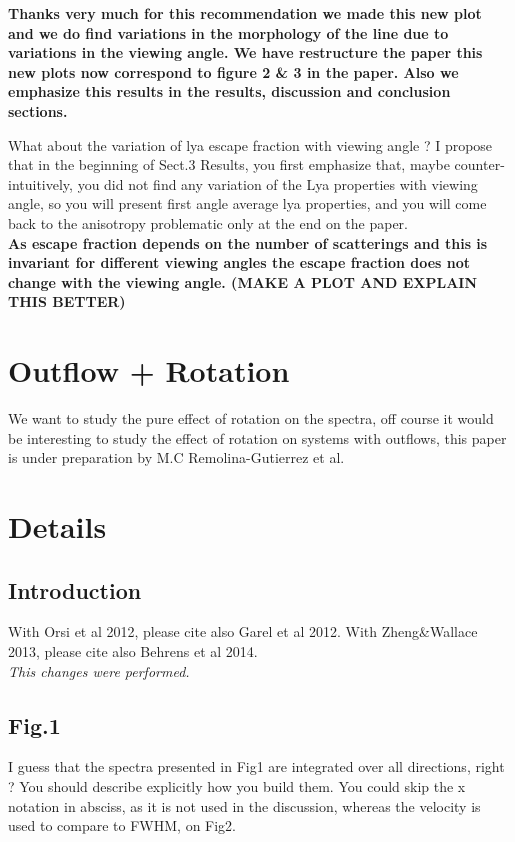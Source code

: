 \documentclass[12pt]{article}
\begin{document}
\textbf{Thanks very much for this recommendation we made this new plot and we do find variations in the morphology of the line due to variations in the viewing angle. We have restructure the paper this new plots now correspond to figure 2 & 3 in the paper.  Also we emphasize this results in the results, discussion and conclusion sections.\\}

What about the variation of lya escape fraction with viewing angle ? I propose that in the beginning of Sect.3 Results, you first emphasize that, maybe counter-intuitively, you did not find any variation of the Lya properties with viewing angle, so you will present first angle average lya properties, and you will come back to the anisotropy problematic only at the end on the paper.\\

\textbf{As escape fraction depends on the number of scatterings and this is invariant for different viewing angles the escape fraction does not change with the viewing angle. (MAKE A PLOT AND EXPLAIN THIS BETTER)
}


\section*{Outflow + Rotation}

We want to study the pure effect of rotation on the spectra, off course it would
be interesting to study the effect of rotation on systems with outflows, this paper
is under preparation by M.C Remolina-Gutierrez et al.  

\section*{Details}

\subsection*{Introduction}

With Orsi et al 2012, please cite also Garel et al 2012. With Zheng&Wallace 2013, please cite also Behrens et al 2014.\\

\textit{This changes were performed.}
\subsection*{Fig.1}

I guess that the spectra presented in Fig1 are integrated over all directions, right ? You should describe explicitly how you build them. You could skip the x notation in absciss, as it is not used in the discussion, whereas the velocity is used to compare to FWHM, on Fig2.\\
\end{document}
